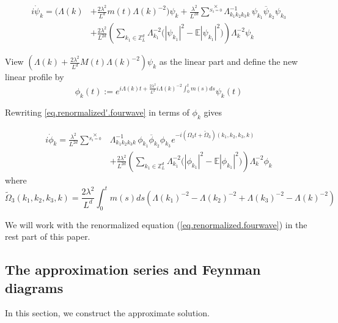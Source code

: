 \begin{equation}\label{eq.renormalized'.fourwave}
\begin{split}
i \dot{\psi}_{k} 
= \bigg(\Lambda(k)&+\frac{2\lambda^2}{L^{d}} m(t)\Lambda(k)^{-2}\bigg) \psi_k
+\frac{\lambda^2}{L^{2d}} \sum^{\times}\limits_{S_3=0} \Lambda_{k_1k_2k_3k}^{-1}\,\psi_{k_1}\overline{\psi}_{k_2} \psi_{k_3}
\\
&+\frac{2\lambda^2}{L^{2d}} \left(\sum\limits_{k_1\in \mathbb{Z}^d_L} \Lambda_{k_1}^{-2}\Big(|\psi_{k_1}|^2-\mathbb{E} |\psi_{k_1}|^2\Big) \right) \Lambda_{k}^{-2}\psi_{k} 
\end{split}
\end{equation}

View $\left(\Lambda(k)+\frac{2\lambda^2}{L^{d}} M(t)\Lambda(k)^{-2}\right) \psi_k$ as the linear part and define the new linear profile by
\begin{equation}
\phi_k(t):= e^{i\Lambda(k) t+\frac{2\lambda^2}{L^{d}} i \Lambda(k)^{-2}\int^t_{0}m(s) ds} \psi_k(t) 
\end{equation}

Rewriting \eqref{eq.renormalized'.fourwave} in terms of $\phi_k$ gives 

\begin{equation}\label{eq.renormalized.fourwave}
\begin{split}
i \dot{\phi}_{k} 
= \frac{\lambda^2}{L^{2d}} \sum^{\times}\limits_{S_3=0} & \Lambda_{k_1k_2k_3k}^{-1}\,\phi_{k_1}\overline{\phi}_{k_2} \phi_{k_3}e^{- i (\Omega_3t+\widetilde{\Omega}_3)(k_1,k_2,k_3,k)}
\\
&+\frac{2\lambda^2}{L^{2d}} \left(\sum\limits_{k_1\in \mathbb{Z}^d_L} \Lambda_{k_1}^{-2}\Big(|\phi_{k_1}|^2-\mathbb{E} |\phi_{k_1}|^2\Big) \right) \Lambda_{k}^{-2}\phi_{k} 
\end{split}
\end{equation}
where
\begin{equation}
 \widetilde{\Omega}_3(k_1,k_2,k_3,k)=\frac{2\lambda^2}{L^{d}} \int^t_{0}m(s) ds\left(\Lambda(k_1)^{-2}-\Lambda(k_2)^{-2}+\Lambda(k_3)^{-2}-\Lambda(k)^{-2}\right)
\end{equation}

We will work with the renormalized equation (\ref{eq.renormalized.fourwave}) in the rest part of this paper. 

\subsection{The approximation series and Feynman diagrams}\label{sec.appFey.fourwave} In this section, we construct the approximate solution. 

